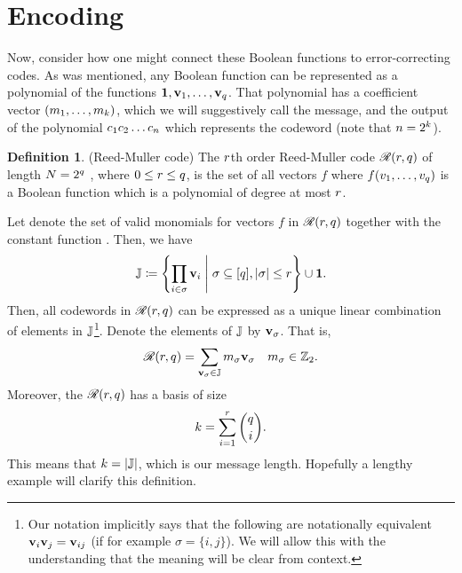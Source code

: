 \documentclass[12pt,twoside]{reedthesis}
\theoremstyle{definition}
\newtheorem{definition}[theorem]{Definition}
\newcommand{\Z}{\mathbb{Z}}
\newcommand{\suchthat}{\;\ifnum\currentgrouptype=16 \middle\fi|\;}
\begin{document}
\section{Encoding}
Now, consider how one might connect these Boolean functions to error-correcting codes. As was mentioned, any Boolean function can be represented as a polynomial of the functions $\mathbf{1}, \mathbf{v}_{1}, \ldots, \mathbf{v}_{q}$. That polynomial has a coefficient vector $(m_{1}, \ldots, m_{k})$, which we will suggestively call the message, and the output of the polynomial $c_{1}c_{2} \ldots c_{n}$ which represents the codeword (note that $n = 2^k$). 


\begin{definition} (Reed-Muller code) The $r$th order Reed-Muller code $\mathscr{R}(r, q)$ of length $N = 2^q$ , where $0 \leq r \leq q$, is the set of all vectors $f$ where $f(v_{1}, \ldots, v_{q})$ is a Boolean function which is a polynomial of degree at most $r$.
\end{definition}
Let \rmexp denote the set of valid monomials for vectors $f$ in $\mathscr{R}(r, q)$ together with the constant function \consto. Then, we have
\begin{equation*}
\rmexp \coloneqq 
\left \{
	\prod_{i \in \sigma} \bv{i} \suchthat  \sigma \subseteq [\numin], \lvert \sigma \rvert \leq \degrm 
\right \} \cup \consto.
\end{equation*}
Then, all codewords in $\mathscr{R}(r, q)$ can be expressed as a unique linear combination of elements in $\mathbb{J}$\footnote{Our notation implicitly says that  the following are notationally equivalent $\mathbf{v}_{i}\mathbf{v}_{j} = \mathbf{v}_{ij}$ (if for example $\sigma = \{i, j\}$). We will allow this with the understanding that the meaning will be clear from context.}. Denote the elements of $\mathbb{J}$ by $\mathbf{v}_{\sigma}$. That is,
\begin{equation} \label{reed_muller_poly}
\mathscr{R}(\degrm, \numin) = \sum_{\bv{\sigma} \in \rmexp} \m{\sigma} \bv{\sigma}  \quad \m{\sigma} \in \Z_2.
\end{equation}
Moreover, the $\mathscr{R}(r, q)$ has a basis of size
\begin{equation}
k = \sum_{i = 1}^{r} {q \choose i}.
\end{equation}
This means that $k = \lvert \mathbb{J} \rvert$, which is our message length.
Hopefully a lengthy example will clarify this definition.
\end{document}
